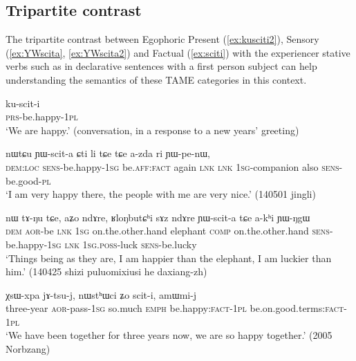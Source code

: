  \subsection{Tripartite contrast} \label{sec:egophoric.tripartite}
     
The tripartite contrast between Egophoric Present (\ref{ex:kusciti2}), Sensory (\ref{ex:YWscita}, \ref{ex:YWscita2}) and Factual (\ref{ex:sciti}) with the experiencer stative verbs such as  in  declarative sentences with a first person subject can help understanding the semantics of these TAME categories in this context.


\begin{exe}
\ex \label{ex:kusciti2}
\gll ku-scit-i \\
\textsc{prs}-be.happy-\textsc{1pl} \\
\glt `We are happy.' (conversation, in a response to a new years' greeting)
\end{exe}

\begin{exe}
\ex \label{ex:YWscita}
\gll nɯtɕu ɲɯ-scit-a ɕti li tɕe tɕe a-zda ri ɲɯ-pe-nɯ, \\
\textsc{dem}:\textsc{loc} \textsc{sens}-be.happy-\textsc{1sg} be.\textsc{aff}:\textsc{fact} again \textsc{lnk} \textsc{lnk} \textsc{1sg}-companion also \textsc{sens}-be.good-\textsc{pl} \\
\glt `I am very happy there, the people with me are very nice.' (140501 jingli) 
\end{exe}
 
\begin{exe}
\ex \label{ex:YWscita2}
\gll nɯ tɤ-ŋu tɕe, aʑo ndɤre, ʁloŋbutɕʰi sɤz ndɤre ɲɯ-scit-a tɕe a-kʰi ɲɯ-ŋgɯ \\
\textsc{dem} \textsc{aor}-be \textsc{lnk} \textsc{1sg} on.the.other.hand elephant \textsc{comp} on.the.other.hand \textsc{sens}-be.happy-\textsc{1sg} \textsc{lnk} \textsc{1sg}.\textsc{poss}-luck \textsc{sens}-be.lucky \\
\glt `Things being as they are, I am happier than the elephant, I am luckier than him.' (140425 shizi puluomixiusi he daxiang-zh)
\end{exe}


\begin{exe}
\ex \label{ex:sciti}
\gll χsɯ-xpa jɤ-tsu-j, nɯstʰɯci ʑo scit-i, amɯmi-j  \\
three-year \textsc{aor}-pass-\textsc{1sg} so.much \textsc{emph} be.happy:\textsc{fact}-\textsc{1pl} be.on.good.terms:\textsc{fact}-\textsc{1pl} \\
\glt `We have been together for three years now, we are so happy together.' (2005 Norbzang)
\end{exe}

